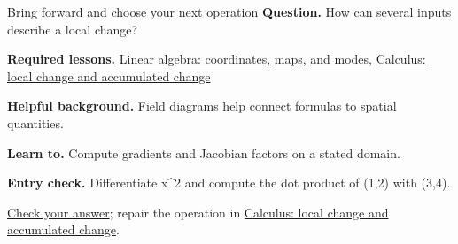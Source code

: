 \begin{learningcard}{Bring forward and choose your next operation}
\textsf{\textbf{Question.}} How can several inputs describe a local change?\par
\textbf{Required lessons.} \hyperref[learn:linear_algebra]{Linear algebra: coordinates, maps, and modes}, \hyperref[learn:calculus]{Calculus: local change and accumulated change}\par
\textbf{Helpful background.} Field diagrams help connect formulas to spatial quantities.\par
\textbf{Learn to.} Compute gradients and Jacobian factors on a stated domain.\par
\textbf{Entry check.} Differentiate x\textasciicircum{}2 and compute the dot product of (1,2) with (3,4).\par
\hyperref[solution:entry:multivariable]{Check your answer}; repair the operation in \hyperref[learn:calculus]{Calculus: local change and accumulated change}.
\end{learningcard}
